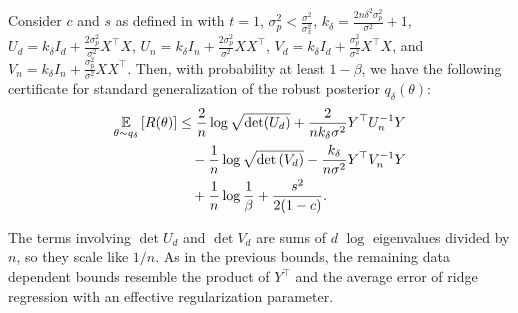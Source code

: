\begin{theorem} \label{thm:adv_post_std_loss}
Consider $c$ and $s$ as defined in  with $t=1$, $\sigma_p^2 < \frac{\sigma^2}{\sigma_x^2}$, 
$k_\delta = \frac{2n\delta^2\sigma_p^2}{\sigma^2} + 1$, 
$U_d= k_\delta I_d + \frac{2\sigma_p^2}{\sigma^2} X^\top X$,
$U_n= k_\delta I_n + \frac{2\sigma_p^2}{\sigma^2} XX^\top$, 
$V_d= k_\delta I_d + \frac{\sigma_p^2}{\sigma^2} X^\top X$, and $V_n= k_\delta I_n + \frac{\sigma_p^2}{\sigma^2} X X^\top$. Then, with probability at least $1-\beta$, we have the following certificate for standard generalization of the robust posterior ${q}_\delta(\theta)$: 
\begin{align}
\underset{  \theta \sim {q}_\delta}{\mathbb{E}}\left[R(\theta)\right]  &\leq \frac{2}{n} \log \sqrt{\det(U_d)} + \frac{2}{n k_\delta \sigma^2}Y^\top U_n^{-1} Y \nonumber \\
&\quad - \frac{1}{n} \log \sqrt{\det \left( V_d \right)} -  \frac{k_\delta}{n \sigma^2} Y^\top V_n^{-1} Y \nonumber \\
&\quad + \frac{1}{n} \log \frac{1}{\beta}  +\frac{s^2}{2(1-c)}. 
\label{eq:pac_bayes_adv_post_std_loss}
\end{align}
\end{theorem}
The terms involving $\det U_d$ and $\det V_d$ are sums of $d$ $\log$ eigenvalues divided by $n$, so they scale like $1 / n$. 
As in the previous bounds, the remaining data dependent bounds resemble the product of $Y^\top$ and the average error of ridge regression with an effective regularization parameter.

